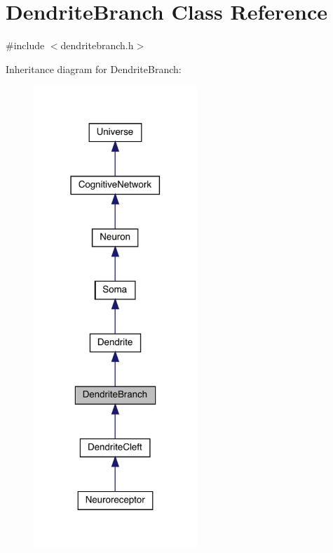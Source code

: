 \hypertarget{class_dendrite_branch}{}\section{Dendrite\+Branch Class Reference}
\label{class_dendrite_branch}


{\ttfamily \#include $<$dendritebranch.\+h$>$}



Inheritance diagram for Dendrite\+Branch\+:\nopagebreak
\begin{figure}[H]
\begin{center}
\leavevmode
\includegraphics[width=175pt]{class_dendrite_branch__inherit__graph}
\end{center}
\end{figure}



